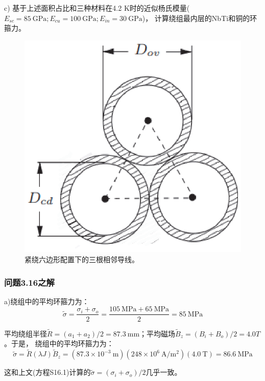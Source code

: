 c) 基于上述面积占比和三种材料在4.2 K时的近似杨氏模量($E_{sc} = 85\ \mathrm{GPa}  ; E_{cu} = 100\ \mathrm{GPa}; E_{in} = 30 \ \mathrm{GPa}$)，
计算绕组最内层的NbTi和铜的环箍力。
\begin{figure}[htbp]
	\centering
	\includegraphics[scale=0.5]{chpt3/figs/fig3.45.eps}
	\caption{紧绕六边形配置下的三根相邻导线。}
\end{figure}


\subsubsection{问题3.16之解}
a)绕组中的平均环箍力为：
\begin{equation*}
\tilde{\sigma}=\frac{\sigma_{i}+\sigma_{o}}{2}=\frac{105\ \mathrm{MPa}+65\ \mathrm{MPa}}{2}%
=85\ \mathrm{MPa}\tag{S16.1}
\end{equation*}

平均绕组半径$\tilde{R}= (a_1 + a_2)/2=87.3\ \mathrm{mm}$；平均磁场$\tilde{B}_z = (B_i + B_o)/2=4.0 T$。于是，
绕组中的平均环箍力为：
\begin{equation*}
\tilde{\sigma}=\tilde{R}(\lambda J)\tilde{B}_{z}=(87.3\times 10^{-3}\ \mathrm{m})(248\times 10^{6}\ \mathrm{A/m^{2}})(4.0\ \mathrm{T})%
=86.6\ \mathrm{MPa} \tag{S16.2}
\end{equation*}

这和上文(方程S16.1)计算的$\tilde{\sigma}=(\sigma_i+\sigma_o)/2$几乎一致。

